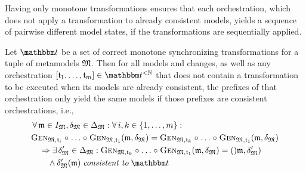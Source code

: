 Having only monotone transformations ensures that each orchestration, which does not apply a transformation to already consistent models, yields a sequence of pairwise different model states, if the transformations are sequentially applied.
\begin{lemma}
    \label{lemma:monotonetransformationsnosamestates}
    Let $\transformationset{T}$ be a set of correct monotone synchronizing transformations for a tuple of metamodels $\metamodeltuple{M}$.
    Then for all models and changes, as well as any orchestration $\sequenced{\transformation{t}_{1}, \dots, \transformation{t}_{m}} \in \transformationset{T}^{< \mathbb{N}}$ that does not contain a transformation to be executed when its models are already consistent, the prefixes of that orchestration only yield the same models if those prefixes are consistent orchestrations, i.e.,
    \begin{align*}
        &
        \forall \modeltuple{m} \in \metamodeltupleinstanceset{M}, \changetuple{\metamodeltuple{M}} \in \changeuniverse{\metamodeltuple{M}} : \forall i, k \in \setted{1, \dots, m} : \\
        &
        \generalizationfunction{\metamodeltuple{M}, \transformation{t}_{i}} \concatfunction \dots \concatfunction \generalizationfunction{\metamodeltuple{M}, \transformation{t}_{1}}(\modeltuple{m}, \changetuple{\metamodeltuple{M}}) = \generalizationfunction{\metamodeltuple{M}, \transformation{t}_{k}} \concatfunction \dots \concatfunction \generalizationfunction{\metamodeltuple{M}, \transformation{t}_{1}}(\modeltuple{m}, \changetuple{\metamodeltuple{M}}) \\
        & \formulaskip 
        \Rightarrow
        \exists \changetuple{\metamodeltuple{M}}' \in \changeuniverse{\metamodeltuple{M}} :
        \generalizationfunction{\metamodeltuple{M}, \transformation{t}_{k}} \concatfunction \dots \concatfunction \generalizationfunction{\metamodeltuple{M}, \transformation{t}_{1}}(\modeltuple{m}, \changetuple{\metamodeltuple{M}}) = ()\modeltuple{m}, \changetuple{\metamodeltuple{M}}') \\
        & \formulaskip\formulaskip
        \land 
        \changetuple{\metamodeltuple{M}}'(\modeltuple{m}) \consistenttomath \transformationset{T}
        \end{align*}
\end{lemma}
